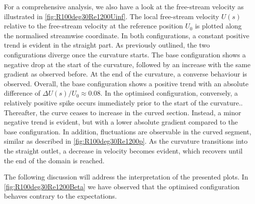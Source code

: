 For a  comprehensive  analysis, we also have a look at the free-stream velocity as illustrated  in \autoref{fig:R100deg30Re1200Uinf}.
The local free-stream velocity $U(s)$ relative to the free-stream velocity at the reference position $U_0$ is plotted along the normalised streamwise coordinate.
In both configurations, a constant positive trend is evident in the straight part.
As previously outlined, the two configurations diverge once the curvature starts.
The base configuration shows a negative drop at the start of the curvature, followed by an  increase with the same gradient as observed before.
At the end of the curvature, a converse behaviour  is observed.
Overall, the base configuration shows a positive trend with an absolute difference of $\Delta U(s)/U_0 \approx 0.08$.
In the optimised configuration, conversely,  a relatively positive spike  occurs immediately prior to the start of the curvature..
Thereafter, the curve ceases to increase in the curved section. 
Instead, a minor negative trend is evident, but with a lower absolute gradient compared to  the base configuration.
In addition,  fluctuations are observable in the curved segment, similar as described in \autoref{fig:R100deg30Re1200p}.
As the curvature transitions into the straight outlet, a decrease in velocity becomes evident, which recovers until the end of the domain is reached.


The following discussion will address the interpretation  of the presented plots. 
In \autoref{fig:R100deg30Re1200Beta} we have observed that the optimised configuration behaves contrary to the expectations.


